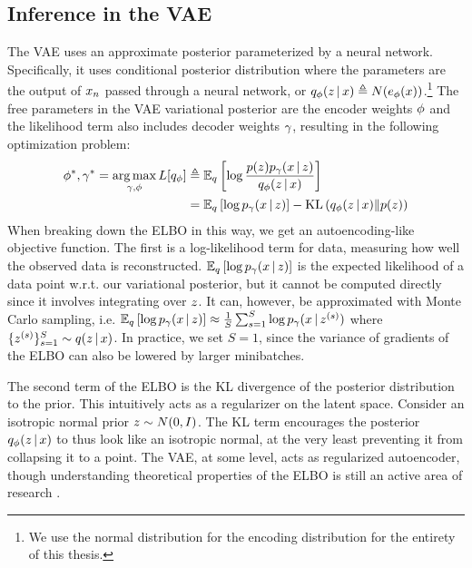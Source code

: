 \subsection{Inference in the VAE}
The VAE uses an approximate posterior
parameterized by a neural network.
Specifically, it uses conditional 
posterior distribution where the
parameters are the output of $x_n$
passed through a neural network,
or
$q_\phi(z \,|\, x) \triangleq N(e_\phi(x))$.\footnote{We use the normal distribution for the encoding distribution for the entirety of this thesis.}
The free parameters in the VAE 
variational posterior are the
encoder weights $\phi$ 
and the likelihood term
also includes decoder weights $\gamma$, resulting
in the following optimization problem:
\begin{align*}
\phi^*,\gamma^* = \operatorname*{arg\,max}_{\gamma, \phi} L[q_\phi] &\triangleq \mathbb{E}_q\left[\log \frac{p(z)p_\gamma(x \,|\, z)}{q_\phi(z \,|\, x)}\right] \\
&= \mathbb{E}_q \left[ \log p_\gamma(x \,|\, z)\right] - \mathrm{KL}\left(q_\phi(z \,|\, x)\|p(z)\right)
\end{align*}
When breaking down the ELBO in this way,
we get an autoencoding-like objective function.
The first is a log-likelihood term for data, measuring how well the observed data is reconstructed.
$\mathbb{E}_q \left[ \log p_\gamma(x \,|\, z)\right]$ is 
the expected likelihood of a data point w.r.t.
our variational posterior, but it cannot be computed directly
since it involves integrating over
$z$. It can, however, 
be approximated with Monte Carlo sampling, i.e. $\mathbb{E}_q \left[ \log p_\gamma(x \,|\, z)\right] \approx \frac{1}{S}\sum_{s=1}^S \log p_\gamma(x \,|\, z^{(s)})$ where $\{z^{(s)}\}_{s = 1}^S \sim q(z \,|\, x)$.
In practice, we set $S = 1$, since the variance of gradients
of the ELBO can also be lowered by larger minibatches.

The second term of the ELBO is the KL divergence of the posterior distribution to the prior. This intuitively acts as
a regularizer on the latent space. Consider
an isotropic normal prior $z \sim N(0, I)$. The KL
term encourages the posterior $q_\phi(z \,|\, x)$
to thus look like an isotropic normal, 
at the very least preventing it from collapsing it to
a point. 
The VAE, at some level, acts as regularized autoencoder, though understanding theoretical properties of the ELBO
is still an active area of research \citep{Burda2015, Hoffman2016, Alemi2017}.

